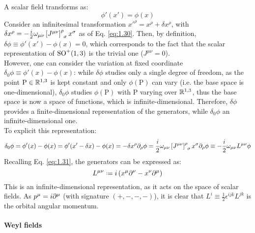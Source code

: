 A scalar field transforms as:
\begin{equation}
  \phi'(x') = \phi(x)
  \label{eq:1.43}
\end{equation}
Consider an infinitesimal transformation $ x'^\rho = x^\rho + \delta x^\rho $, with $ \delta x^\rho = - \frac{i}{2} \omega_{\mu \nu} \tensor{\left[ J^{\mu \nu} \right]}{^\rho_\sigma} x^\sigma $ as of Eq. \ref{eq:1.30}. Then, by definition, $ \delta \phi \equiv \phi'(x') - \phi(x) = 0 $, which corresponds to the fact that the scalar representation of $ \mathrm{SO}^+(1,3) $ is the trivial one ($ J^{\mu \nu} = 0 $).\\
However, one can consider the variation at fixed coordinate $ \delta_0 \phi \equiv \phi'(x) - \phi(x) $: while $ \delta \phi $ studies only a single degree of freedom, as the point $ \text{P} \in \mathbb{R}^{1,3} $ is kept constant and only $ \phi(\text{P}) $ can vary (i.e. the base space is one-dimensional), $ \delta_0 \phi $ studies $ \phi(\text{P}) $ with $ \text{P} $ varying over $ \mathbb{R}^{1,3} $, thus the base space is now a space of functions, which is infinite-dimensional. Therefore, $ \delta \phi $ provides a finite-dimensional representation of the generators, while $ \delta_0 \phi $ an infinite-dimensional one.\\
To explicit this representation:
\begin{equation*}
  \delta_0 \phi = \phi'(x) - \phi(x) = \phi'(x' - \delta x) - \phi(x) = - \delta x^\rho \pa_\rho \phi = \frac{i}{2} \omega_{\mu \nu} \tensor{\left[ J^{\mu \nu} \right]}{^\rho_\sigma} x^\sigma \pa_\rho \phi \equiv - \frac{i}{2} \omega_{\mu \nu} L^{\mu \nu} \phi
\end{equation*}
Recalling Eq. \ref{eq:1.31}, the generators can be expressed as:
\begin{equation}
  L^{\mu \nu} \defeq i \left( x^\mu \pa^\nu - x^\nu \pa^\mu \right)
  \label{eq:1.44}
\end{equation}
This is an infinite-dimensional representation, as it acts on the space of scalar fields. As $ p^\mu = i \partial^\mu $ (with signature $ (+,-,-,-) $), it is clear that $ L^i \equiv \frac{1}{2} \epsilon^{ijk} L^{jk} $ is the orbital angular momentum.

\paragraph{Weyl fields}

